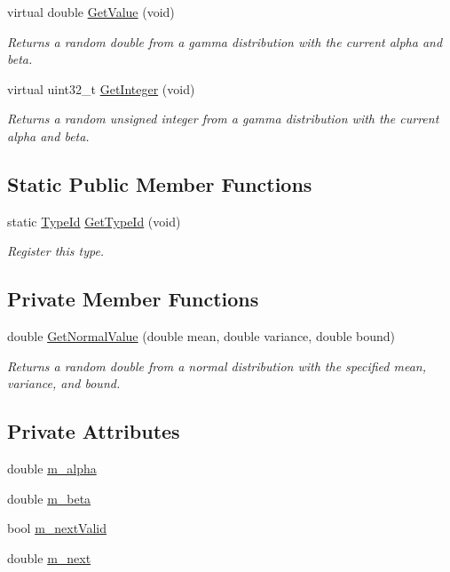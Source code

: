 \begin{DoxyCompactItemize}
virtual double \hyperlink{classns3_1_1GammaRandomVariable_a65261ad340fa57dbaa5802a7bea354db}{Get\+Value} (void)
\begin{DoxyCompactList}\small\item\em Returns a random double from a gamma distribution with the current alpha and beta. \end{DoxyCompactList}\item 
virtual uint32\+\_\+t \hyperlink{classns3_1_1GammaRandomVariable_a2a7c359ab7961fafd4785a0dfc14ab67}{Get\+Integer} (void)
\begin{DoxyCompactList}\small\item\em Returns a random unsigned integer from a gamma distribution with the current alpha and beta. \end{DoxyCompactList}\end{DoxyCompactItemize}
\subsection*{Static Public Member Functions}
\begin{DoxyCompactItemize}
\item 
static \hyperlink{classns3_1_1TypeId}{Type\+Id} \hyperlink{classns3_1_1GammaRandomVariable_a7b748133cfc4dc1a6fcdee1906df16e5}{Get\+Type\+Id} (void)
\begin{DoxyCompactList}\small\item\em Register this type. \end{DoxyCompactList}\end{DoxyCompactItemize}
\subsection*{Private Member Functions}
\begin{DoxyCompactItemize}
\item 
double \hyperlink{classns3_1_1GammaRandomVariable_a65f2515eaf15d4540509c9620c844c57}{Get\+Normal\+Value} (double mean, double variance, double bound)
\begin{DoxyCompactList}\small\item\em Returns a random double from a normal distribution with the specified mean, variance, and bound. \end{DoxyCompactList}\end{DoxyCompactItemize}
\subsection*{Private Attributes}
\begin{DoxyCompactItemize}
\item 
double \hyperlink{classns3_1_1GammaRandomVariable_a4f69114edfb9930edc95e368f9d37128}{m\+\_\+alpha}
\item 
double \hyperlink{classns3_1_1GammaRandomVariable_af9e209b6f30711920d0cb502e382e85a}{m\+\_\+beta}
\item 
bool \hyperlink{classns3_1_1GammaRandomVariable_a9824f728f2f97299387ca3990464de85}{m\+\_\+next\+Valid}
\item 
double \hyperlink{classns3_1_1GammaRandomVariable_a192cfe661857c7e669e19a7984fd9491}{m\+\_\+next}
\end{DoxyCompactItemize}

